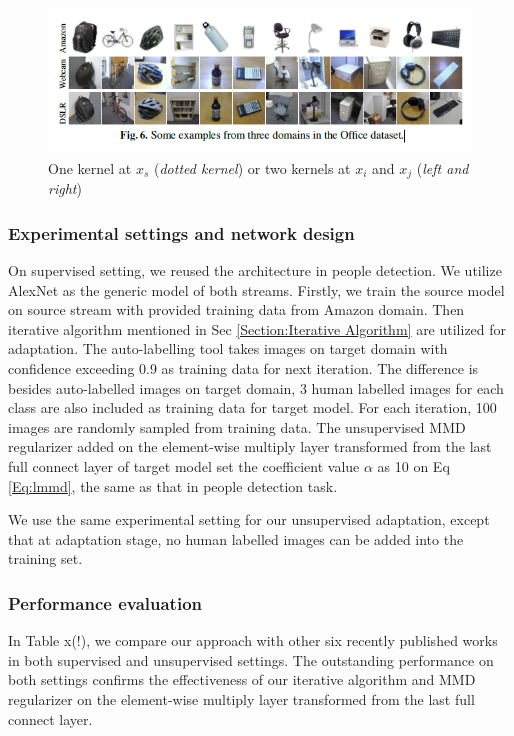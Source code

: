 \documentclass[runningheads]{llncs}
\begin{document}
\begin{figure}
\centering
\includegraphics[height=4cm]{images/officeimages.png}
\caption{One kernel at $x_s$ ({\it dotted kernel}) or two kernels at
$x_i$ and $x_j$ ({\it left and right}) }
\label{fig:example}
\end{figure}

\subsubsection{Experimental settings and network design}
On supervised setting, we reused the architecture in people detection. We utilize AlexNet \cite{krizhevsky2012imagenet} as the generic model of both streams. Firstly, we train the source model on source stream with provided training data from Amazon domain. Then iterative algorithm mentioned in Sec \ref{Section:Iterative Algorithm} are utilized for adaptation. The auto-labelling tool takes images on target domain with confidence exceeding 0.9 as training data for next iteration. The difference is besides auto-labelled images on target domain, 3 human labelled images for each class are also included as training data for target model. For each iteration, 100 images are randomly sampled from training data. The unsupervised MMD regularizer added on the element-wise multiply layer transformed from the last full connect layer of target model set the coefficient value $\alpha$ as 10 on Eq \ref{Eq:lmmd}, the same as that in people detection task.

We use the same experimental setting for our unsupervised adaptation, except that at adaptation stage, no human labelled images can be added into the training set.
\subsubsection{Performance evaluation}
In Table x(!), we compare our approach with other six recently published works in both supervised and unsupervised settings. The outstanding performance on both settings confirms the effectiveness of our iterative algorithm and MMD regularizer on the element-wise multiply layer transformed from the last full connect layer.
\end{document}
